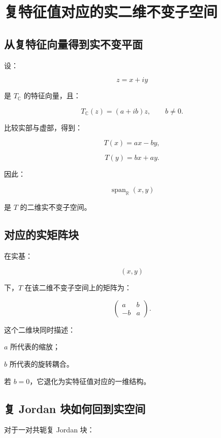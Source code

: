 
\chapter{复特征值对应的实二维不变子空间}


\section{从复特征向量得到实不变平面}

设：

\[
z=x+iy
\]

是 $T_{\mathbb C}$ 的特征向量，且：

\[
T_{\mathbb C}(z)
=
(a+ib)z,
\qquad
b\ne0.
\]

比较实部与虚部，得到：

\[
T(x)=ax-by,
\]

\[
T(y)=bx+ay.
\]

因此：

\[
\operatorname{span}_{\mathbb R}(x,y)
\]

是 $T$ 的二维实不变子空间。

\section{对应的实矩阵块}

在实基：

\[
(x,y)
\]

下，$T$ 在该二维不变子空间上的矩阵为：

\[
\begin{pmatrix}
a&b\\
-b&a
\end{pmatrix}.
\]

这个二维块同时描述：

\begin{jitem}
\item %
$a$ 所代表的缩放；
\item %
$b$ 所代表的旋转耦合。
\end{jitem}

若 $b=0$，它退化为实特征值对应的一维结构。

\section{复 Jordan 块如何回到实空间}

对于一对共轭复 Jordan 块：

